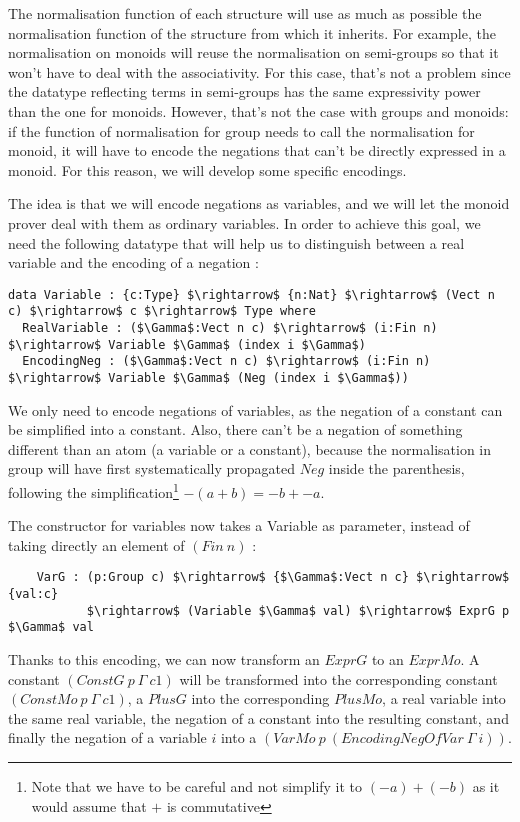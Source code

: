 The normalisation function of each structure will use as much as possible the normalisation function of the structure from which it inherits. For example, the normalisation on monoids will reuse the normalisation on semi-groups so that it won't have to deal with the associativity. For this case, that's not a problem since the datatype reflecting terms in semi-groups has the same expressivity power than the one for monoids. However, that's not the case with groups and monoids: if the function of normalisation for group needs to call the normalisation for monoid, it will have to encode the negations that can't be directly expressed in a monoid. For this reason, we will develop some specific encodings.

The idea is that we will encode negations as variables, and we will let the monoid prover deal with them as ordinary variables. In order to achieve this goal, we need the following datatype that will help us to distinguish between a real variable and the encoding of a negation :

\begin{lstlisting}
data Variable : {c:Type} $\rightarrow$ {n:Nat} $\rightarrow$ (Vect n c) $\rightarrow$ c $\rightarrow$ Type where
  RealVariable : ($\Gamma$:Vect n c) $\rightarrow$ (i:Fin n) $\rightarrow$ Variable $\Gamma$ (index i $\Gamma$)
  EncodingNeg : ($\Gamma$:Vect n c) $\rightarrow$ (i:Fin n) $\rightarrow$ Variable $\Gamma$ (Neg (index i $\Gamma$))
\end{lstlisting}

We only need to encode negations of variables, as the negation of a constant can be simplified into a constant. Also, there can't be a negation of something different than an atom (a variable or a constant), because the normalisation in group will have first systematically propagated $Neg$ inside the parenthesis, following the simplification\footnote{Note that we have to be careful and not simplify it to $(-a) + (-b)$ as it would assume that $+$ is commutative} $-(a+b) = -b + -a$.

The constructor for variables now takes a Variable as parameter, instead of taking directly an element of $(Fin\ n)$ :

\begin{lstlisting}
    VarG : (p:Group c) $\rightarrow$ {$\Gamma$:Vect n c} $\rightarrow$ {val:c} 
           $\rightarrow$ (Variable $\Gamma$ val) $\rightarrow$ ExprG p $\Gamma$ val
\end{lstlisting}


Thanks to this encoding, we can now transform an $ExprG$ to an $ExprMo$. A constant $(ConstG\ p\ \Gamma\ c1)$ will be transformed into the corresponding constant $(ConstMo\ p\ \Gamma\ c1)$, a $PlusG$ into the corresponding $PlusMo$, a real variable into the same real variable, the negation of a constant into the resulting constant, and finally the negation of a variable $i$ into a $(VarMo\ p\ (EncodingNegOfVar\ \Gamma\ i))$.


